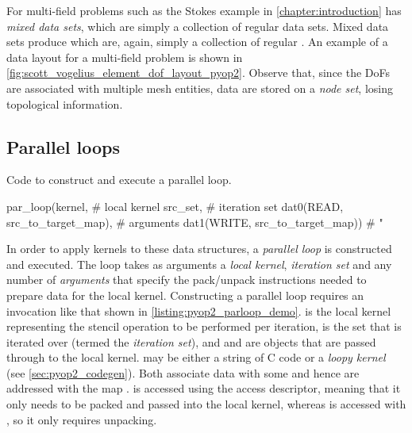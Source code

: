 \documentclass[thesis]{subfiles}
\begin{document}
For multi-field problems such as the Stokes example in \cref{chapter:introduction}  has \emph{mixed data sets}, which are simply a collection of regular data sets.
Mixed data sets produce  which are, again, simply a collection of regular .
An example of a  data layout for a multi-field problem is shown in \cref{fig:scott_vogelius_element_dof_layout_pyop2}.
Observe that, since the DoFs are associated with multiple mesh entities, data are stored on a \emph{node set}, losing topological information.

\subsection{Parallel loops}
\label{sec:pyop2_parallel}

\begin{listing}
  \caption{Code to construct and execute a  parallel loop.}
  \begin{minipage}{.9\textwidth}
    \begin{pyalg2}
      par_loop(kernel,                          # local kernel
               src_set,                         # iteration set
               dat0(READ, src_to_target_map),   # arguments
               dat1(WRITE, src_to_target_map))  #    "
    \end{pyalg2}
  \end{minipage}
  \label{listing:pyop2_parloop_demo}
\end{listing}

In order to apply kernels to these data structures, a \emph{parallel loop} is constructed and executed.
The loop takes as arguments a \emph{local kernel}, \emph{iteration set} and any number of \emph{arguments} that specify the pack/unpack instructions needed to prepare data for the local kernel.
Constructing a parallel loop requires an invocation like that shown in \cref{listing:pyop2_parloop_demo}.
 is the local kernel representing the stencil operation to be performed per iteration,  is the set that is iterated over (termed the \emph{iteration set}), and  and  are  objects that are passed through to the local kernel.
 may be either a string of C code or a \emph{loopy kernel} (see \cref{sec:pyop2_codegen}).
Both  associate data with some  and hence are addressed with the map .
 is accessed using the  access descriptor, meaning that it only needs to be packed and passed into the local kernel, whereas  is accessed with , so it only requires unpacking.
\end{document}

